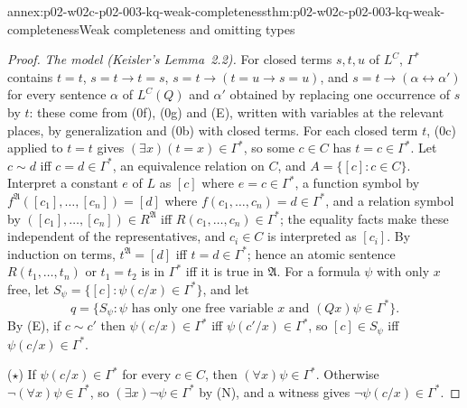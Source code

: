 \begin{annexitem}{annex:p02-w02c-p02-003-kq-weak-completeness}{thm:p02-w02c-p02-003-kq-weak-completeness}{Weak completeness and omitting types}
\begin{proof}
\emph{The model (Keisler's Lemma~2.2).}  For closed terms \(s,t,u\) of
\(L^{C}\), \(\Gamma^{*}\) contains \(t=t\), \(s=t\to t=s\),
\(s=t\to(t=u\to s=u)\), and \(s=t\to(\alpha\leftrightarrow\alpha')\) for
every sentence \(\alpha\) of \(L^{C}(Q)\) and \(\alpha'\) obtained by
replacing one occurrence of \(s\) by \(t\): these come from (0f), (0g) and
(E), written with variables at the relevant places, by generalization and
(0b) with closed terms.  For each closed term \(t\), (0c) applied to
\(t=t\) gives \((\exists x)(t=x)\in\Gamma^{*}\), so some \(c\in C\) has
\(t=c\in\Gamma^{*}\).  Let \(c\sim d\) iff \(c=d\in\Gamma^{*}\), an
equivalence relation on \(C\), and \(A=\{[c]:c\in C\}\).  Interpret a
constant \(e\) of \(L\) as \([c]\) where \(e=c\in\Gamma^{*}\), a function
symbol by \(f^{\mathfrak A}([c_1],\ldots,[c_n])=[d]\) where
\(f(c_1,\ldots,c_n)=d\in\Gamma^{*}\), and a relation symbol by
\(([c_1],\ldots,[c_n])\in R^{\mathfrak A}\) iff
\(R(c_1,\ldots,c_n)\in\Gamma^{*}\); the equality facts make these
independent of the representatives, and \(c_i\in C\) is interpreted as
\([c_i]\).  By induction on terms, \(t^{\mathfrak A}=[d]\) iff
\(t=d\in\Gamma^{*}\); hence an atomic sentence \(R(t_1,\ldots,t_n)\) or
\(t_1=t_2\) is in \(\Gamma^{*}\) iff it is true in \(\mathfrak A\).  For a
formula \(\psi\) with only \(x\) free, let
\(S_\psi=\{[c]:\psi(c/x)\in\Gamma^{*}\}\), and let
\[
 q=\{S_\psi:\psi\text{ has only one free variable }x\text{ and }(Qx)\psi\in\Gamma^{*}\}.
\]
By (E), if \(c\sim c'\) then \(\psi(c/x)\in\Gamma^{*}\) iff
\(\psi(c'/x)\in\Gamma^{*}\), so \([c]\in S_\psi\) iff \(\psi(c/x)\in\Gamma^{*}\).

(\(\star\)) If \(\psi(c/x)\in\Gamma^{*}\) for every \(c\in C\), then
\((\forall x)\psi\in\Gamma^{*}\).  Otherwise \(\neg(\forall
x)\psi\in\Gamma^{*}\), so \((\exists x)\neg\psi\in\Gamma^{*}\) by (N), and a
witness gives \(\neg\psi(c/x)\in\Gamma^{*}\).


\end{proof}
\end{annexitem}
